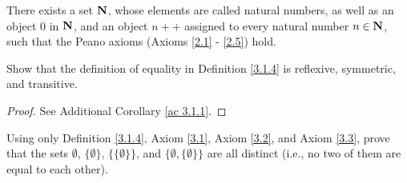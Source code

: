 \begin{axiom}[Infinity]\label{3.7}
    There exists a set \(\mathbf{N}\), whose elements are called natural numbers, as well as an object \(0\) in \(\mathbf{N}\), and an object \(n++\) assigned to every natural number \(n \in \mathbf{N}\), such that the Peano axioms (Axioms \ref{2.1} - \ref{2.5}) hold.
\end{axiom}

\exercisesection

\begin{exercise}\label{ex 3.1.1}
    Show that the definition of equality in Definition \ref{3.1.4} is reflexive, symmetric, and transitive.
\end{exercise}

\begin{proof}
    See Additional Corollary \ref{ac 3.1.1}.
\end{proof}

\begin{exercise}\label{ex 3.1.2}
    Using only Definition \ref{3.1.4}, Axiom \ref{3.1}, Axiom \ref{3.2}, and Axiom \ref{3.3}, prove that the sets \(\emptyset\), \(\{\emptyset\}\), \(\{\{\emptyset\}\}\), and \(\{\emptyset, \{\emptyset\}\}\) are all distinct
    (i.e., no two of them are equal to each other).
\end{exercise}

